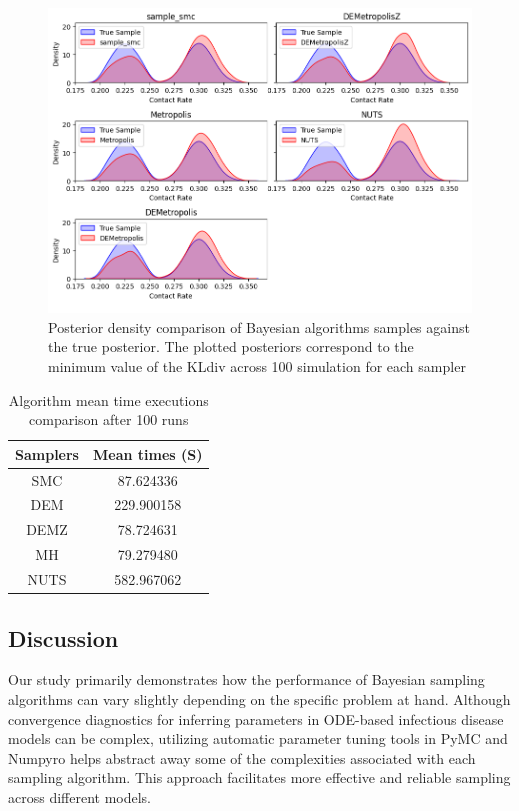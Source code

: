 \documentclass[nonatbib,preprint,12pt,authoryear]{elsarticle}
\begin{document}
\begin{figure}
    \centering
    \includegraphics[width=0.9\linewidth]{Figures/Reverse-Ingineering/Multi_run_all_posterior_plot.png}
    \caption{Posterior density comparison of Bayesian algorithms samples against the true posterior. The plotted posteriors correspond to the minimum value of the KL\textunderscore div across 100 simulation for each sampler }
    \label{fig:Posterior-density-compar}
\end{figure}

\begin{table}[H]
    \centering
    \begin{tabular}{|c|c|} \hline 
         Samplers& Mean times (S)\\ \hline 
         SMC& 87.624336
\\ \hline 
         DEM& 229.900158
\\ \hline 
         DEMZ& 78.724631
\\ \hline 
         MH& 79.279480\\ \hline 
         NUTS& 582.967062\\ \hline
    \end{tabular}
    \caption{Algorithm mean time executions comparison after 100 runs }
    \label{tab:Reverse_Time_execution}
\end{table}

\subsection{Discussion}
Our study primarily demonstrates how the performance of Bayesian sampling algorithms can vary slightly depending on the specific problem at hand. Although convergence diagnostics for inferring parameters in ODE-based infectious disease models can be complex, utilizing automatic parameter tuning tools in PyMC and Numpyro helps abstract away some of the complexities associated with each sampling algorithm. This approach facilitates more effective and reliable sampling across different models. 
\end{document}
